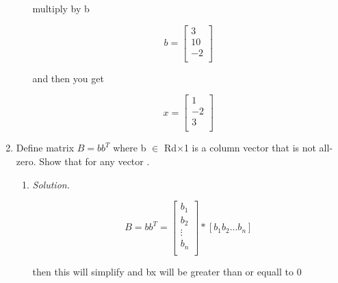 \documentclass[12pt]{amsart}
\theoremstyle{definition}
\theoremstyle{remark}
\newcommand\sol[1]{\begin{mdframed}
\emph{Solution.} #1
\end{mdframed}}
\begin{document}
\begin{enumerate}
\begin{enumerate}
{multiply by b 

 \[
b=
  \left[ {\begin{array}{c}
   3 \\
   10 \\
   -2 \\
  \end{array} } \right]
\]

and then you get


 \[
x=
  \left[ {\begin{array}{c}
   1 \\
   -2 \\
   3 \\
  \end{array} } \right]
\]

}


\end{enumerate}

\item Define matrix $B = bb^T$ where b $\in$  Rd×1 is a column vector that is not all-zero.
Show that for any vector .

\begin{enumerate}

\item

\sol{

\[
 B = bb^T = 
  \left[ {\begin{array}{c}
   b_1 \\
   b_2 \\
   \vdots \\
   b_n \\
  \end{array} } \right]  *  [b_1 b_2 ... b_n]
  \]

then this will simplify and bx will be greater than or equall to 0



}




\end{enumerate}


\end{enumerate}
\end{document}
